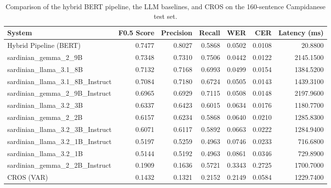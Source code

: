 \begin{table}
\caption{Comparison of the hybrid BERT pipeline, the LLM baselines, and CROS on the 160-sentence Campidanese test set.}
\label{tab:comparison}
\begin{tabular}{lrrrrrr}
\toprule
System & F0.5 Score & Precision & Recall & WER & CER & Latency (ms) \\
\midrule
Hybrid Pipeline (BERT) & 0.7477 & 0.8027 & 0.5868 & 0.0502 & 0.0108 & 20.8800 \\
sardinian\_gemma\_2\_9B & 0.7348 & 0.7310 & 0.7506 & 0.0442 & 0.0122 & 2145.1500 \\
sardinian\_llama\_3.1\_8B & 0.7132 & 0.7168 & 0.6993 & 0.0499 & 0.0154 & 1384.5200 \\
sardinian\_llama\_3.1\_8B\_Instruct & 0.7084 & 0.7180 & 0.6724 & 0.0505 & 0.0143 & 1439.3100 \\
sardinian\_gemma\_2\_9B\_Instruct & 0.6965 & 0.6929 & 0.7115 & 0.0508 & 0.0148 & 2197.9600 \\
sardinian\_llama\_3.2\_3B & 0.6337 & 0.6423 & 0.6015 & 0.0634 & 0.0176 & 1180.7700 \\
sardinian\_gemma\_2\_2B & 0.6157 & 0.6234 & 0.5868 & 0.0640 & 0.0210 & 1285.8300 \\
sardinian\_llama\_3.2\_3B\_Instruct & 0.6071 & 0.6117 & 0.5892 & 0.0663 & 0.0222 & 1284.9400 \\
sardinian\_llama\_3.2\_1B\_Instruct & 0.5197 & 0.5259 & 0.4963 & 0.0746 & 0.0233 & 716.6800 \\
sardinian\_llama\_3.2\_1B & 0.5144 & 0.5192 & 0.4963 & 0.0861 & 0.0346 & 729.8900 \\
sardinian\_gemma\_2\_2B\_Instruct & 0.1909 & 0.1636 & 0.5721 & 0.3343 & 0.2725 & 1700.7000 \\
CROS (VAR) & 0.1432 & 0.1321 & 0.2152 & 0.2149 & 0.0584 & 1229.7400 \\
\bottomrule
\end{tabular}
\end{table}
